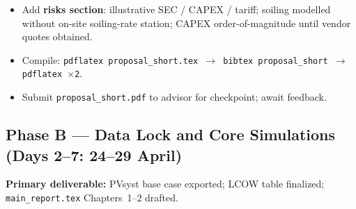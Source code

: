 \documentclass[11pt,a4paper]{article}
\begin{document}
\begin{description}[style=nextline,leftmargin=2cm,font=\normalfont\bfseries]
  \item[Day~2 \textnormal{(Fri 24 Apr)}]
  \begin{itemize}[nosep]
    \item Add \textbf{risks section}: illustrative SEC / CAPEX / tariff; soiling modelled without on-site soiling-rate station; CAPEX order-of-magnitude until vendor quotes obtained.
    \item Compile: \texttt{pdflatex proposal\_short.tex $\rightarrow$ bibtex proposal\_short $\rightarrow$ pdflatex $\times$2}.
    \item Submit \texttt{proposal\_short.pdf} to advisor for checkpoint; await feedback.
  \end{itemize}
\end{description}

\subsection*{Phase B --- Data Lock and Core Simulations (Days 2--7: 24--29 April)}
\textbf{Primary deliverable:} PVsyst base case exported; LCOW table finalized; \texttt{main\_report.tex} Chapters~1--2 drafted.
\end{document}
